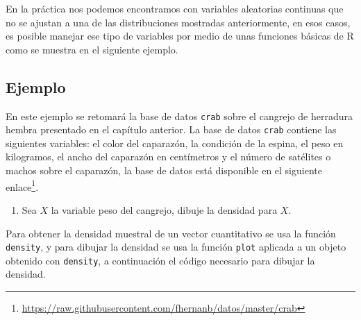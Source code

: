 \documentclass[
]{book}
\makeatletter
\newenvironment{Shaded}{\begin{snugshade}}{\end{snugshade}}
\newcommand{\AttributeTok}[1]{\textcolor[rgb]{0.77,0.63,0.00}{#1}}
\newcommand{\DecValTok}[1]{\textcolor[rgb]{0.00,0.00,0.81}{#1}}
\newcommand{\FunctionTok}[1]{\textcolor[rgb]{0.00,0.00,0.00}{#1}}
\newcommand{\NormalTok}[1]{#1}
\newcommand{\OtherTok}[1]{\textcolor[rgb]{0.56,0.35,0.01}{#1}}
\newcommand{\SpecialCharTok}[1]{\textcolor[rgb]{0.00,0.00,0.00}{#1}}
\newcommand{\StringTok}[1]{\textcolor[rgb]{0.31,0.60,0.02}{#1}}
\providecommand{\tightlist}{%
  \setlength{\itemsep}{0pt}\setlength{\parskip}{0pt}}
\renewcommand{\href}[2]{#2\footnote{\url{#1}}}
\newenvironment{kframe}{%
\medskip{}
\setlength{\fboxsep}{.8em}
 \def\at@end@of@kframe{}%
 \ifinner\ifhmode%
  \def\at@end@of@kframe{\end{minipage}}%
  \begin{minipage}{\columnwidth}%
 \fi\fi%
 \def\FrameCommand##1{\hskip\@totalleftmargin \hskip-\fboxsep
 \colorbox{shadecolor}{##1}\hskip-\fboxsep
     \hskip-\linewidth \hskip-\@totalleftmargin \hskip\columnwidth}%
 \MakeFramed {\advance\hsize-\width
   \@totalleftmargin\z@ \linewidth\hsize
   \@setminipage}}%
 {\par\unskip\endMakeFramed%
 \at@end@of@kframe}
\renewenvironment{Shaded}{\begin{kframe}}{\end{kframe}}
\makeatother
\begin{document}
En la práctica nos podemos encontramos con variables aleatorias continuas que no se ajustan a una de las distribuciones mostradas anteriormente, en esos casos, es posible manejar ese tipo de variables por medio de unas funciones básicas de R como se muestra en el siguiente ejemplo.

\hypertarget{ejemplo-48}{%
\subsection*{Ejemplo}\label{ejemplo-48}}

En este ejemplo se retomará la base de datos \texttt{crab} sobre el cangrejo de herradura hembra presentado en el capítulo anterior. La base de datos \texttt{crab} contiene las siguientes variables: el color del caparazón, la condición de la espina, el peso en kilogramos, el ancho del caparazón en centímetros y el número de satélites o machos sobre el caparazón, la base de datos está disponible en el siguiente \href{https://raw.githubusercontent.com/fhernanb/datos/master/crab}{enlace}.

\begin{enumerate}
\def\labelenumi{\arabic{enumi})}
\tightlist
\item
  Sea \(X\) la variable peso del cangrejo, dibuje la densidad para \(X\).
\end{enumerate}

Para obtener la densidad muestral de un vector cuantitativo se usa la función \texttt{density}, y para dibujar la densidad se usa la función \texttt{plot} aplicada a un objeto obtenido con \texttt{density}, a continuación el código necesario para dibujar la densidad.

\begin{Shaded}
\end{Shaded}
\end{document}
